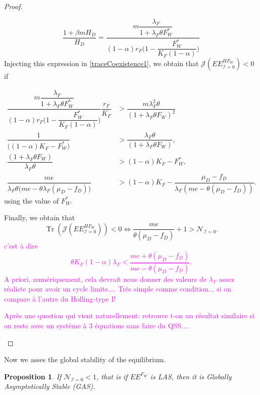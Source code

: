 \documentclass{article}
\newcommand{\lfw}{\lambda_{F}}
\newcommand{\lfw}{\lambda_{F}}
\newcommand{\cI}{\mathcal{I}}
\newcommand{\YD}[1]{\textcolor{magenta}{#1}}
\DeclareMathOperator{\Tr}{Tr}
\newtheorem{prop}{Proposition}
\begin{document}
\begin{proof}
\begin{itemize}
\begin{equation*}
\dfrac{1+ \beta m H_D}{H_D} = \dfrac{m\dfrac{\lfw}{1 + \lfw \theta F_W^*}}{(1-\alpha)r_F\Big(1 - \dfrac{F^*_{W}}{K_F(1-\alpha)} \Big)}
\end{equation*}
Injecting this expression in \eqref{traceCoexistence1}, we obtain that $\mathcal{J}(EE^{HF_W}_{\cI = 0}) < 0$ if

\begin{subequations}
\begin{align*}
\dfrac{m\dfrac{\lfw}{1 + \lfw \theta F_W^*}}{(1-\alpha)r_F\Big(1 - \dfrac{F^*_{W}}{K_F(1-\alpha)} \Big)} \dfrac{r_F}{K_F} &>  \dfrac{ m \lfw^2 \theta }{(1 + \lfw \theta F_W)^2} \\
\dfrac{1}{\Big((1-\alpha) K_F - {F^*_{W}} \Big)}  &>  \dfrac{ \lfw \theta }{(1 + \lfw \theta F_W)}, \\
\dfrac{(1 + \lfw \theta F_W)}{ \lfw \theta } & > (1-\alpha) K_F - F^*_{W}, \\
\dfrac{me}{ \lfw \theta \Big(me - \theta \lfw (\mu_D - f_D) \Big)} & > (1-\alpha) K_F - \dfrac{\mu_D - f_D}{\lfw (me - \theta (\mu_D - f_D))}.
\end{align*}
\end{subequations}
using the value of $F_W^*$.

Finally, we obtain that 
\begin{equation*}
\Tr(\mathcal{J}(EE^{HF_W}_{\cI = 0})) < 0 \Leftrightarrow \dfrac{me}{\theta (\mu_D - f_D)} + 1 > \mathcal{N}_{\cI = 0}.
\end{equation*}
\YD{c'est à dire
$$
\theta K_{F}(1-\alpha)\lambda_{F}<\dfrac{me+\theta(\mu_{D}-f_{D})}{me-\theta(\mu_{D}-f_{D})}.
$$
A priori, numériquement, cela devrait nous donner des valeurs de $\lambda_F$ assez réaliste pour avoir un cycle limite.... Très simple comme condition... si on compare à l'autre du Holling-type I! }

\YD{Après une question qui vient naturellement: retrouve t-on un résultat similaire si on reste avec un système à 3 équations sans faire du QSS....
}
\end{itemize}

\end{proof}

Now we asses the global stability of the equilibrium. 

\begin{prop}
If $\mathcal{N}_{\cI = 0} < 1$, that is if $EE^{F_W}$ is LAS, then it is Globally Asymptotically Stable (GAS).
\end{prop}
\end{document}
